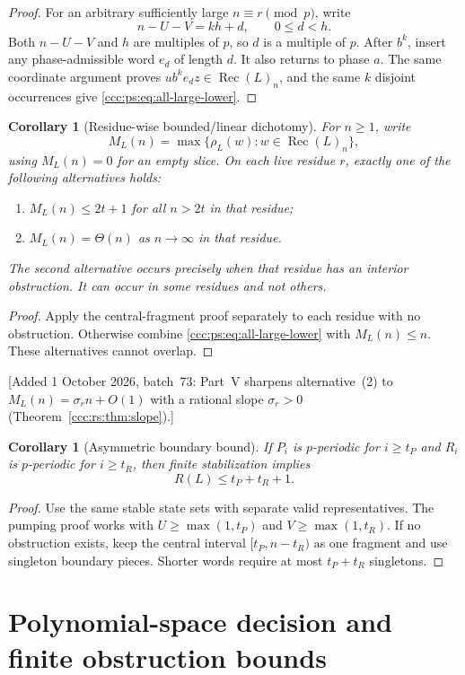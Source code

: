 \documentclass[11pt,letterpaper]{article}
\newtheorem{corollary}[theorem]{Corollary}
\theoremstyle{definition}
\theoremstyle{remark}
\newcommand{\rec}{\operatorname{Rec}}
\newcommand{\rank}{\rho}
\newcommand{\waddsevthree}[1]{\textup{[}Added 1 October 2026, batch~73: #1\textup{]}}
\begin{document}
\begin{proof}
For an arbitrary sufficiently large $n\equiv r\pmod p$, write
\[
 n-U-V=kh+d,\qquad 0\le d<h.
\]
Both $n-U-V$ and $h$ are multiples of $p$, so $d$ is a multiple of $p$.
After $b^k$, insert any phase-admissible word $e_d$ of length $d$.
It also returns to phase $a$. The same coordinate argument proves
$ub^ke_dz\in\rec(L)_n$, and the same $k$ disjoint occurrences give
\eqref{ccc:ps:eq:all-large-lower}.
\end{proof}

\begin{corollary}[Residue-wise bounded/linear dichotomy]\label{ccc:ps:cor:residue}
For $n\ge1$, write
\[
 M_L(n)=\max\{\rank_L(w):w\in\rec(L)_n\},
\]
using $M_L(n)=0$ for an empty slice. On each live residue $r$, exactly one
of the following alternatives holds:
\begin{enumerate}
\item $M_L(n)\le2t+1$ for all $n>2t$ in that residue;
\item $M_L(n)=\Theta(n)$ as $n\to\infty$ in that residue.
\end{enumerate}
The second alternative occurs precisely when that residue has an interior
obstruction. It can occur in some residues and not others.
\end{corollary}
\begin{proof}
Apply the central-fragment proof separately to each residue with no
obstruction. Otherwise combine \eqref{ccc:ps:eq:all-large-lower} with
$M_L(n)\le n$. These alternatives cannot overlap.
\end{proof}
\waddsevthree{Part~V sharpens alternative~(2) to $M_L(n)=\sigma_rn+O(1)$
with a rational slope $\sigma_r>0$ (Theorem~\ref{ccc:rs:thm:slope}).}

\begin{corollary}[Asymmetric boundary bound]\label{ccc:ps:cor:asymmetric}
If $P_i$ is $p$-periodic for $i\ge t_P$ and $R_i$ is $p$-periodic for
$i\ge t_R$, then finite stabilization implies
\[
 R(L)\le t_P+t_R+1.
\]
\end{corollary}
\begin{proof}
Use the same stable state sets with separate valid representatives.
The pumping proof works with $U\ge\max(1,t_P)$ and
$V\ge\max(1,t_R)$. If no obstruction exists, keep the central interval
$[t_P,n-t_R)$ as one fragment and use singleton boundary pieces. Shorter
words require at most $t_P+t_R$ singletons.
\end{proof}

\section{Polynomial-space decision and finite obstruction bounds}\label{ccc:ps:sec:space}
\end{document}
